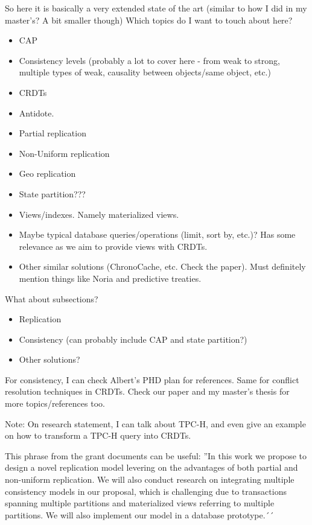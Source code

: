 So here it is basically a very extended state of the art (similar to how I did in my master's? A bit smaller though)
Which topics do I want to touch about here?
\begin{itemize}
	\item CAP
	\item Consistency levels (probably a lot to cover here - from weak to strong, multiple types of weak, causality between objects/same object, etc.)
	\item CRDTs
	\item Antidote.
	\item Partial replication
	\item Non-Uniform replication
	\item Geo replication
	\item State partition???
	\item Views/indexes. Namely materialized views.
	\item Maybe typical database queries/operations (limit, sort by, etc.)? Has some relevance as we aim to provide views with CRDTs.
	\item Other similar solutions (ChronoCache, etc. Check the paper). Must definitely mention things like Noria and predictive treaties.
\end{itemize}

What about subsections?
\begin{itemize}
	\item Replication
	\item Consistency (can probably include CAP and state partition?)
	\item Other solutions?
\end{itemize}

For consistency, I can check Albert's PHD plan for references. Same for conflict resolution techniques in CRDTs.
Check our paper and my master's thesis for more topics/references too.

Note: On research statement, I can talk about TPC-H, and even give an example on how to transform a TPC-H query into CRDTs.

This phrase from the grant documents can be useful:
''In this work we propose to design a novel replication model levering on the advantages of both partial and non-uniform replication. We will also conduct research on integrating multiple consistency models in our proposal, which is challenging due to transactions spanning multiple partitions and materialized views referring to multiple partitions. We will also implement our model in a database prototype.´´


